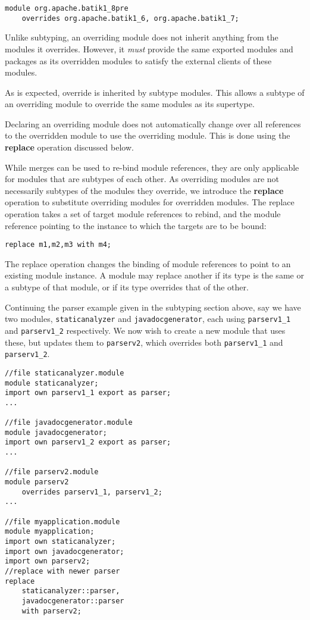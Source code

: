 \begin{lstlisting}
module org.apache.batik1_8pre 
	overrides org.apache.batik1_6, org.apache.batik1_7;
\end{lstlisting}

Unlike subtyping, an overriding module does not inherit anything from the
modules it overrides. However, it \textit{must} provide the same exported modules
and packages as its overridden modules to satisfy the external 
clients of these modules.

As is expected, override is inherited by subtype modules. This allows a subtype
of an overriding module to override the same modules as its supertype.

Declaring an overriding module does not automatically change over all references
to the overridden module to use the overriding module. This is done using the
\textbf{replace} operation discussed below.


While merges can be used to re-bind module references, they are only applicable 
for modules that are subtypes of each other. As overriding modules are not
necessarily subtypes of the modules they override, we introduce the \textbf{replace} operation
to substitute overriding modules for overridden modules. The replace operation
takes a set of target module references to rebind, and the module reference pointing to the 
instance to which the targets are to be bound:

\begin{lstlisting}
replace m1,m2,m3 with m4;
\end{lstlisting}

The replace operation
changes the binding of module references to point to an existing
module instance. A module may replace another if its type is the same or a subtype
of that module, or if its type overrides that of the other.

Continuing the parser example given in the subtyping section above, say we have two 
modules, {\tt staticanalyzer} and {\tt javadocgenerator}, each using {\tt parserv1\_1}
and {\tt parserv1\_2} respectively. We now wish to create a new module that uses these, 
but updates them to {\tt parserv2}, which overrides both {\tt parserv1\_1} and {\tt parserv1\_2}.

\begin{lstlisting}[caption=Module Replace]
//file staticanalyzer.module
module staticanalyzer;
import own parserv1_1 export as parser;
...

//file javadocgenerator.module
module javadocgenerator;
import own parserv1_2 export as parser;
...

//file parserv2.module
module parserv2 
	overrides parserv1_1, parserv1_2;
...

//file myapplication.module
module myapplication;
import own staticanalyzer;
import own javadocgenerator;
import own parserv2;
//replace with newer parser
replace 
	staticanalyzer::parser,
	javadocgenerator::parser
	with parserv2;
\end{lstlisting}

